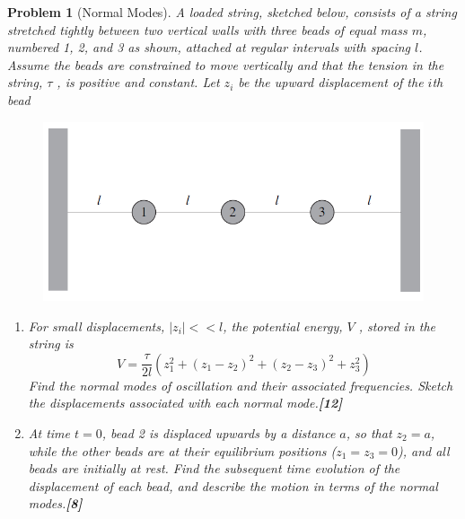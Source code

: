 \documentclass[a4paper]{article}
\theoremstyle{new}
\newtheorem{qns}{Problem}[section]
\begin{document}
\begin{qns}[Normal Modes]
A loaded string, sketched below, consists of a string stretched tightly between two vertical walls with three beads of equal mass $m$, numbered 1, 2, and 3 as shown, attached at regular intervals with spacing $l$. Assume the beads are constrained to move vertically and that the tension in the string, $\tau$ , is positive and constant. Let $z_i$ be the upward displacement of the $i$th bead 
\begin{figure}[H]
    \centering
    \includegraphics[scale=0.35]{2014P2Q7.PNG}
\end{figure}
\begin{enumerate}[label=(\roman*)]
\item For small displacements, $|z_i|<< l$, the potential energy, $V$ , stored in the string is
$$V=\frac{\tau}{2l}(z_1^2+(z_1-z_2)^2+(z_2-z_3)^2+z_3^2)$$
Find the normal modes of oscillation and their associated frequencies. Sketch the displacements associated with each normal mode.\hfill\textbf{[12]}
\item At time $t = 0$, bead 2 is displaced upwards by a distance $a$, so that $z_2 = a$, while the other beads are at their equilibrium positions ($z_1 = z_3 = 0$), and all beads are initially at rest. Find the subsequent time evolution of the displacement of each bead, and describe the motion in terms of the normal modes.\hfill\textbf{[8]}
\end{enumerate}
\end{qns}
\end{document}
